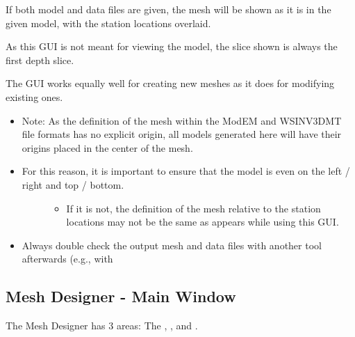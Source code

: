 \documentclass[letterpaper,10pt,english]{sphinxmanual}
\begin{document}
If both model and data files are given, the mesh will be shown as it is in the given model, with the station locations overlaid.

As this GUI is not meant for viewing the model, the slice shown is always the first depth slice.

The GUI works equally well for creating new meshes as it does for modifying existing ones.
\begin{itemize}
\item {} 
Note: As the definition of the mesh within the ModEM and WSINV3DMT file formats has no explicit origin, all models generated here will have their origins placed in the center of the mesh.

\item {} \begin{description}
\item[{For this reason, it is important to ensure that the model is even on the left / right and top / bottom.}] \leavevmode\begin{itemize}
\item {} 
If it is not, the definition of the mesh relative to the station locations may not be the same as appears while using this GUI.

\end{itemize}

\end{description}

\item {} 
Always double check the output mesh and data files with another tool afterwards (e.g., with {\hyperref[\detokenize{content/model_viewer/main_window:model-viewer}]{}}

\end{itemize}


\subsection{Mesh Designer - Main Window}
\label{\detokenize{content/mesh_designer/main_window:mesh-designer-main-window}}\label{\detokenize{content/mesh_designer/main_window:mesh-designer}}\label{\detokenize{content/mesh_designer/main_window::doc}}
\begin{figure}[htbp]
\centering

\noindent{}
\end{figure}

The Mesh Designer has 3 areas: The {\hyperref[\detokenize{content/mesh_designer/main_window:menu-bar}]{}}, {\hyperref[\detokenize{content/mesh_designer/main_window:control-dock}]{}}, and {\hyperref[\detokenize{content/mesh_designer/main_window:plot-window}]{}}.
\end{document}
